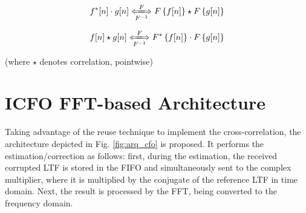  
\begin{equation} 
f^{*}[n] \cdot g[n]  \xLongleftrightarrow[F^{-1}]{F} F\left\{f[n] \right\}  \star F\left\{g[n] \right\}
\label{eq:xcorr_theorem_tf}
\end{equation}

\begin{equation} 
f[n] \star g[n]  \xLongleftrightarrow[F^{-1}]{F} F^{*}  \left\{f[n] \right\}  \cdot F\left\{g[n] \right\}
\label{eq:xcorr_theorem_ft}
\end{equation}
 
(where $\star$ denotes correlation, \cdot pointwise)


 
 
 







\section{ICFO FFT-based Architecture}


\label{sec:icfo_architecture}

Taking advantage of the reuse technique to implement the cross-correlation, 
the architecture depicted in Fig. \ref{fig:arq_cfo} is proposed. It performs the 
estimation/correction as follows: first, during the estimation, the received corrupted LTF is stored in the FIFO and simultaneously sent to 
the complex multiplier, where it is multiplied by the conjugate of the reference LTF in time domain.
Next, the result is processed by the FFT, being converted to the 
frequency domain. 

